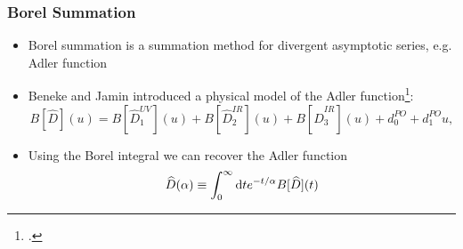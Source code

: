 \documentclass{beamer}
\begin{document}
\begin{frame}
  \frametitle{Borel Summation}
  \begin{itemize}
  \item Borel summation is a summation method for divergent asymptotic series,
    e.g. Adler function
  \item Beneke and Jamin introduced a physical model of the Adler
    function\footcite{Beneke2008}:
    \begin{equation}
      \label{eq:borelModel}
      B[\widehat D](u) = B[\widehat D_1^{UV}](u) + B[\widehat D_2^{IR}](u) + B[\widehat D_3^{IR}](u) + d_0^{PO} + d_1^{PO}u,
    \end{equation}
  \item Using the Borel integral we can recover the Adler function
    \begin{equation}
      \widehat D(\alpha) \equiv \int_0^\infty \dif t e^{-t/\alpha} B[\widehat D](t)
    \end{equation}
  \end{itemize}
\end{frame}
\end{document}
